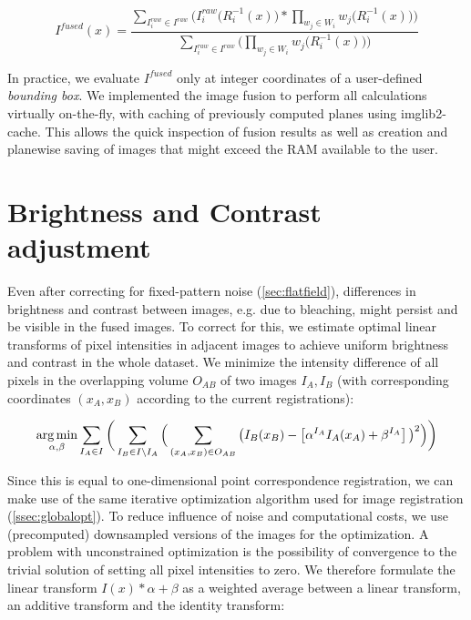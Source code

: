 \begin{equation}
\label{eq:fusion-eq1}
I^{fused}(x) ={ \frac{  \sum_{ I^{raw}_i \in I^{raw}} \Big(I^{raw}_i\big(R_i^{-1}(x)\big) * \prod_{w_j \in W_i}{w_j\big(R_i^{-1}(x)\big)\Big)}}{ \sum_{I^{raw}_i \in I^{raw}}\Big( \prod_{w_j \in W_i}{w_j\big(R_i^{-1}(x)\big)\Big)}}}
\end{equation}

In practice, we evaluate $I^{fused}$ only at integer coordinates of a user-defined \emph{bounding box}. We implemented the image fusion to perform all calculations virtually on-the-fly, with caching of previously computed planes using imglib2-cache. This allows the quick inspection of fusion results as well as creation and planewise saving of images that might exceed the RAM available to the user.

\section{Brightness and Contrast adjustment}
\label{sec:brightness-adjust}

Even after correcting for fixed-pattern noise (\ref{sec:flatfield}), differences in brightness and contrast between images, e.g. due to bleaching, might persist and be visible in the fused images. To correct for this, we estimate optimal linear transforms of pixel intensities in adjacent images \cite{blasse2017premosa} to achieve uniform brightness and contrast in the whole dataset. We minimize the intensity difference of all pixels in the overlapping volume $O_{AB}$ of two images $I_A, I_B$ (with corresponding coordinates $(x_A, x_B)$ according to the current registrations): 

\begin{equation}
\label{eq:brighness-adjust-1}
\operatorname*{arg\,min}_{\alpha, \beta} \sum_{I_A  \in I}  \bigg( \sum_{I_B \in I \setminus I_A} \Big( \sum_{(x_A, x_B) \in O_{AB}} \big( I_B(x_B) - \left[ \alpha^{I_A} I_A(x_A) + \beta^{I_A} \right] \big)^2 \Big)\bigg)
\end{equation}

Since this is equal to one-dimensional point correspondence registration, we can make use of the same iterative optimization algorithm used for image registration (\ref{ssec:globalopt}). To reduce influence of noise and computational costs, we use (precomputed) downsampled versions of the images for the optimization. A problem with unconstrained optimization is the possibility of convergence to the trivial solution of setting all pixel intensities to zero. We therefore formulate the linear transform $I(x)*\alpha + \beta$ as a weighted average between a linear transform, an additive transform and the identity transform:

